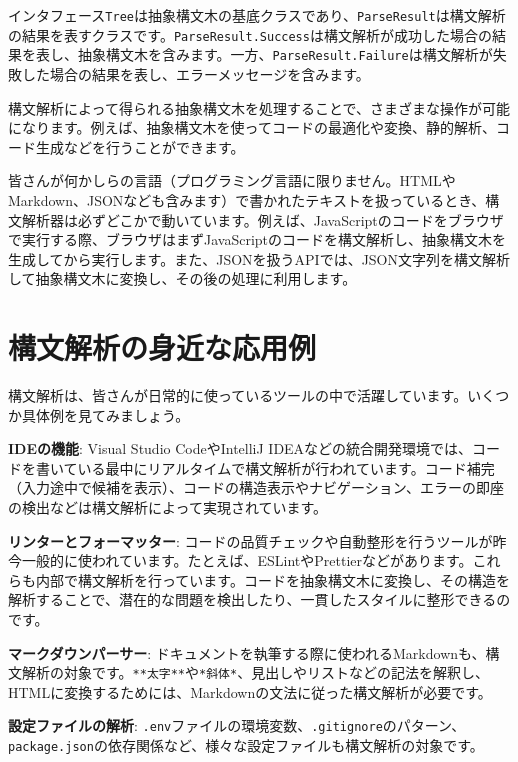 インタフェース\texttt{Tree}は抽象構文木の基底クラスであり、\texttt{ParseResult}は構文解析の結果を表すクラスです。\texttt{ParseResult.Success}は構文解析が成功した場合の結果を表し、抽象構文木を含みます。一方、\texttt{ParseResult.Failure}は構文解析が失敗した場合の結果を表し、エラーメッセージを含みます。

構文解析によって得られる抽象構文木を処理することで、さまざまな操作が可能になります。例えば、抽象構文木を使ってコードの最適化や変換、静的解析、コード生成などを行うことができます。

皆さんが何かしらの言語（プログラミング言語に限りません。HTMLやMarkdown、JSONなども含みます）で書かれたテキストを扱っているとき、構文解析器は必ずどこかで動いています。例えば、JavaScriptのコードをブラウザで実行する際、ブラウザはまずJavaScriptのコードを構文解析し、抽象構文木を生成してから実行します。また、JSONを扱うAPIでは、JSON文字列を構文解析して抽象構文木に変換し、その後の処理に利用します。

\hypertarget{chapter1-ux69cbux6587ux89e3ux6790ux306eux8eabux8fd1ux306aux5fdcux7528ux4f8b}{%
\section{構文解析の身近な応用例}\label{chapter1-ux69cbux6587ux89e3ux6790ux306eux8eabux8fd1ux306aux5fdcux7528ux4f8b}}

構文解析は、皆さんが日常的に使っているツールの中で活躍しています。いくつか具体例を見てみましょう。

\textbf{IDEの機能}: Visual Studio CodeやIntelliJ
IDEAなどの統合開発環境では、コードを書いている最中にリアルタイムで構文解析が行われています。コード補完（入力途中で候補を表示）、コードの構造表示やナビゲーション、エラーの即座の検出などは構文解析によって実現されています。

\textbf{リンターとフォーマッター}:
コードの品質チェックや自動整形を行うツールが昨今一般的に使われています。たとえば、ESLintやPrettierなどがあります。これらも内部で構文解析を行っています。コードを抽象構文木に変換し、その構造を解析することで、潜在的な問題を検出したり、一貫したスタイルに整形できるのです。

\textbf{マークダウンパーサー}:
ドキュメントを執筆する際に使われるMarkdownも、構文解析の対象です。\texttt{**太字**}や\texttt{*斜体*}、見出しやリストなどの記法を解釈し、HTMLに変換するためには、Markdownの文法に従った構文解析が必要です。

\textbf{設定ファイルの解析}:
\texttt{.env}ファイルの環境変数、\texttt{.gitignore}のパターン、\texttt{package.json}の依存関係など、様々な設定ファイルも構文解析の対象です。

